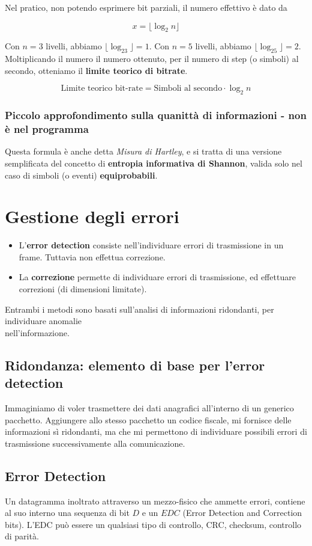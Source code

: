 Nel pratico, non potendo esprimere bit parziali, il numero effettivo è dato da

$$
x= \lfloor\log_2 n\rfloor
$$

Con $n=3$ livelli, abbiamo $\lfloor\log_23\rfloor=1$. Con $n=5$ livelli, abbiamo $\lfloor\log_25\rfloor=2$.
Moltiplicando il numero il numero ottenuto, per il numero di step (o simboli) al secondo, otteniamo il \textbf{limite teorico di bitrate}.

$$
\text{Limite teorico bit-rate} = \text{Simboli al secondo} \cdot \log_2 n
$$
\subsubsection{Piccolo approfondimento sulla quanittà di informazioni - non è nel programma}
Questa formula è anche detta \textit{Misura di Hartley}, e si tratta di una versione semplificata del concetto di \textbf{entropia informativa di Shannon}, valida solo nel caso di simboli (o eventi) \textbf{equiprobabili}.
\newpage

\section{Gestione degli errori}

\begin{itemize}
	\item L'\textbf{error detection} consiste nell'individuare errori di trasmissione in un frame. Tuttavia non effettua correzione.
	
	\item La \textbf{correzione} permette di individuare errori di trasmissione, ed effettuare correzioni (di dimensioni limitate).
\end{itemize}
Entrambi i metodi sono basati sull'analisi di informazioni ridondanti, per individuare anomalie \\nell'informazione.

\subsection{Ridondanza: elemento di base per l'error detection}
Immaginiamo di voler trasmettere dei dati anagrafici all'interno di un generico pacchetto. Aggiungere allo stesso pacchetto un codice fiscale, mi fornisce delle informazioni sì ridondanti, ma che mi permettono di individuare possibili errori di trasmissione successivamente alla comunicazione.

\subsection{Error Detection}
Un datagramma inoltrato attraverso un mezzo-fisico che ammette errori, contiene al suo interno una sequenza di bit $D$ e un $EDC$ (Error Detection and Correction bits). L'EDC può essere un qualsiasi tipo di controllo, CRC, checksum, controllo di parità.



